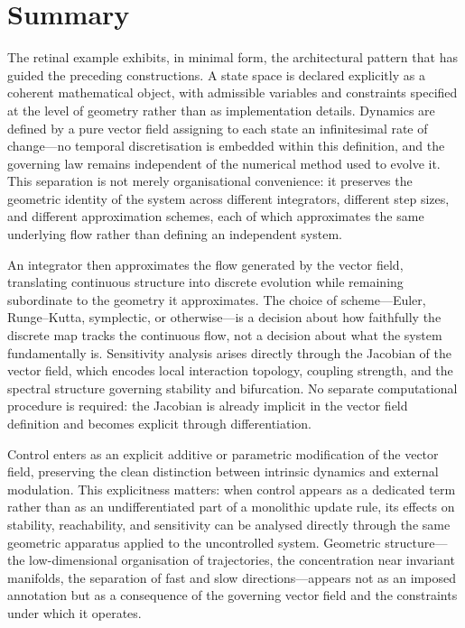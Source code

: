\documentclass[12pt]{book}
\begin{document}
\section{Summary}

The retinal example exhibits, in minimal form, the architectural pattern
that has guided the preceding constructions. A state space is declared
explicitly as a coherent mathematical object, with admissible variables
and constraints specified at the level of geometry rather than as
implementation details. Dynamics are defined by a pure vector field
assigning to each state an infinitesimal rate of change---no temporal
discretisation is embedded within this definition, and the governing law
remains independent of the numerical method used to evolve it. This
separation is not merely organisational convenience: it preserves the
geometric identity of the system across different integrators, different
step sizes, and different approximation schemes, each of which approximates
the same underlying flow rather than defining an independent system.

An integrator then approximates the flow generated by the vector field,
translating continuous structure into discrete evolution while remaining
subordinate to the geometry it approximates. The choice of scheme---Euler, Runge--Kutta, symplectic, or otherwise---is a decision about
how faithfully the discrete map tracks the continuous flow, not a decision
about what the system fundamentally is. Sensitivity analysis arises
directly through the Jacobian of the vector field, which encodes local
interaction topology, coupling strength, and the spectral structure
governing stability and bifurcation. No separate computational procedure
is required: the Jacobian is already implicit in the vector field
definition and becomes explicit through differentiation.

Control enters as an explicit additive or parametric modification of the
vector field, preserving the clean distinction between intrinsic dynamics
and external modulation. This explicitness matters: when control appears
as a dedicated term rather than as an undifferentiated part of a monolithic
update rule, its effects on stability, reachability, and sensitivity can
be analysed directly through the same geometric apparatus applied to the
uncontrolled system. Geometric structure---the low-dimensional
organisation of trajectories, the concentration near invariant manifolds,
the separation of fast and slow directions---appears not as an imposed
annotation but as a consequence of the governing vector field and the
constraints under which it operates.
\end{document}
